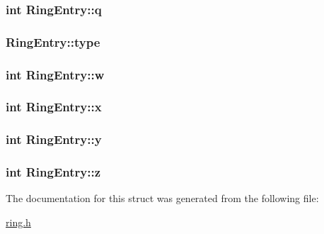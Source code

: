 \subsubsection[{\texorpdfstring{q}{q}}]{\setlength{\rightskip}{0pt plus 5cm}int Ring\+Entry\+::q}\hypertarget{structRingEntry_ae944a4f58e8d867035a9d94366615ff2}{}\label{structRingEntry_ae944a4f58e8d867035a9d94366615ff2}
\subsubsection[{\texorpdfstring{type}{type}}]{ Ring\+Entry\+::type}\hypertarget{structRingEntry_afc77cc123c354240feba6e92dd4ee882}{}\label{structRingEntry_afc77cc123c354240feba6e92dd4ee882}
\subsubsection[{\texorpdfstring{w}{w}}]{\setlength{\rightskip}{0pt plus 5cm}int Ring\+Entry\+::w}\hypertarget{structRingEntry_a5c4cd66b932f7f6c430b12b9b6dc4007}{}\label{structRingEntry_a5c4cd66b932f7f6c430b12b9b6dc4007}
\subsubsection[{\texorpdfstring{x}{x}}]{\setlength{\rightskip}{0pt plus 5cm}int Ring\+Entry\+::x}\hypertarget{structRingEntry_a1d73e65971815248e917087ca69afd63}{}\label{structRingEntry_a1d73e65971815248e917087ca69afd63}
\subsubsection[{\texorpdfstring{y}{y}}]{\setlength{\rightskip}{0pt plus 5cm}int Ring\+Entry\+::y}\hypertarget{structRingEntry_a7f50629b87d74360c6726903cf1452d2}{}\label{structRingEntry_a7f50629b87d74360c6726903cf1452d2}
\subsubsection[{\texorpdfstring{z}{z}}]{\setlength{\rightskip}{0pt plus 5cm}int Ring\+Entry\+::z}\hypertarget{structRingEntry_a8b88d0f404a59333eae214698675c712}{}\label{structRingEntry_a8b88d0f404a59333eae214698675c712}


The documentation for this struct was generated from the following file\+:\begin{DoxyCompactItemize}
\item 
\hyperlink{ring_8h}{ring.\+h}\end{DoxyCompactItemize}
